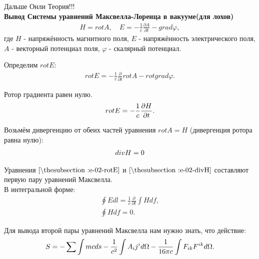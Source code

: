\documentclass[__main__.tex]{subfiles}
\begin{document}
Дальше Онли Теория!!!\\

\textbf{Вывод Системы уравнений Максвелла-Лоренца в вакууме(для лохов)}\\

\begin{gather*}
H = rot A, \quad E = -\frac{1}{c}\frac{\partial A}{\partial t} - grad \varphi,
\end{gather*}
где $H$ - напряжённость магнитного поля, $E$ - напряжённость электрического поля,
$A$ - векторный потенциал поля,
$\varphi$ - скалярный потенциал.

Определим $rot E$:
\begin{gather*}
rot E = -\frac{1}{c}\frac{\partial}{\partial t}rot A - rot grad \varphi.
\end{gather*}

Ротор градиента равен нулю.
\begin{gather}
\llabel{e-02-rotE}
rot E = -\frac{1}{c}\frac{\partial H}{\partial t}.
\end{gather}

Возьмём дивергенцию от обеих частей уравнения $rot A = H$ (дивергенция ротора равна нулю):
\begin{gather}
\llabel{e-02-divH}
div H = 0
\end{gather}

Уравнения $\lref{e-02-rotE}$ и  $\lref{e-02-divH}$ составляют первую пару уравнений Максвелла.\\
В интегральной форме:\\
\begin{gather*}
\oint Edl = \frac{1}{c}\frac{\partial}{\partial t}\int Hdf,\\
\oint H df = 0.
\end{gather*}

Для вывода второй пары уравнений Максвелла нам нужно знать, что действие:
\begin{gather}
\llabel{e-02-S}
S = -\sum\int mcds - \frac{1}{c^2}\int A_ij^id\Omega - \frac{1}{16\pi c}\int F_{ik}F^{ik}d\Omega.
\end{gather}
\end{document}

